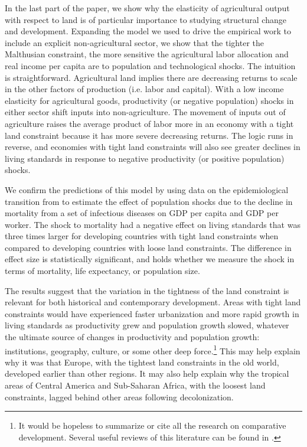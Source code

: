 \documentclass[11pt]{article}
\begin{document}
In the last part of the paper, we show why the elasticity of agricultural output with respect to land is of particular importance to studying structural change and development. Expanding the model we used to drive the empirical work to include an explicit non-agricultural sector, we show that the tighter the Malthusian constraint, the more sensitive the agricultural labor allocation and real income per capita are to population and technological shocks. The intuition is straightforward. Agricultural land implies there are decreasing returns to scale in the other factors of production (i.e. labor and capital). With a low income elasticity for agricultural goods, productivity (or negative population) shocks in either sector shift inputs into non-agriculture. The movement of inputs out of agriculture raises the average product of labor more in an economy with a tight land constraint because it has more severe decreasing returns. The logic runs in reverse, and economies with tight land constraints will also see greater declines in living standards in response to negative productivity (or positive population) shocks.

We confirm the predictions of this model by using data on the epidemiological transition from \cite{aj07} to estimate the effect of population shocks due to the decline in mortality from a set of infectious diseases on GDP per capita and GDP per worker. The shock to mortality had a negative effect on living standards that was three times larger for developing countries with tight land constraints when compared to developing countries with loose land constraints. The difference in effect size is statistically significant, and holds whether we measure the shock in terms of mortality, life expectancy, or population size. 

The results suggest that the variation in the tightness of the land constraint is relevant for both historical and contemporary development. Areas with tight land constraints would have experienced faster urbanization and more rapid growth in living standards as productivity grew and population growth slowed, whatever the ultimate source of changes in productivity and population growth: institutions, geography, culture, or some other deep force.\footnote{It would be hopeless to summarize or cite all the research on comparative development. Several useful reviews of this literature can be found in \cite{ajr2005handbook,nunn_2009,Galor:2011uq,sw2013,vries2013}.} This may help explain why it was that Europe, with the tightest land constraints in the old world, developed earlier than other regions. It may also help explain why the tropical areas of Central America and Sub-Saharan Africa, with the loosest land constraints, lagged behind other areas following decolonization.
\end{document}
